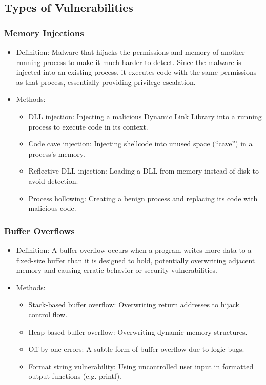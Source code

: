 \documentclass[11pt]{article}
\begin{document}
\subsection{Types of Vulnerabilities}
\label{sec:org822c15d}
\subsubsection{Memory Injections}
\label{sec:org160dd94}
\begin{itemize}
\item Definition: Malware that hijacks the permissions and memory of another running process to make it much harder to detect. Since the malware is injected into an existing process, it executes code with the same permissions as that process, essentially providing privilege escalation.
\item Methods:
\begin{itemize}
\item DLL injection: Injecting a malicious Dynamic Link Library into a running process to execute code in its context.
\item Code cave injection: Injecting shellcode into unused space (``cave'') in a process's memory.
\item Reflective DLL injection: Loading a DLL from memory instead of disk to avoid detection.
\item Process hollowing: Creating a benign process and replacing its code with malicious code.
\end{itemize}
\end{itemize}
\subsubsection{Buffer Overflows}
\label{sec:orgc0daccf}
\begin{itemize}
\item Definition: A buffer overflow occurs when a program writes more data to a fixed-size buffer than it is designed to hold, potentially overwriting adjacent memory and causing erratic behavior or security vulnerabilities.
\item Methods:
\begin{itemize}
\item Stack-based buffer overflow: Overwriting return addresses to hijack control flow.
\item Heap-based buffer overflow: Overwriting dynamic memory structures.
\item Off-by-one errors: A subtle form of buffer overflow due to logic bugs.
\item Format string vulnerability: Using uncontrolled user input in formatted output functions (e.g. printf).
\end{itemize}
\end{itemize}
\end{document}
